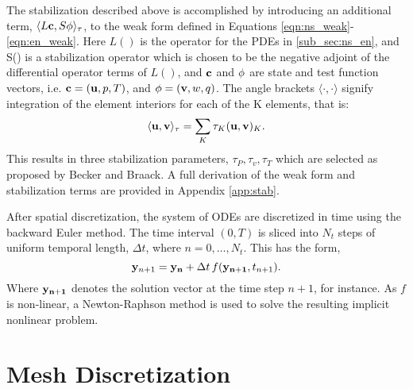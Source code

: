 The stabilization described above is accomplished by introducing an additional term,
$\langle L{\bf c},S {\bf \phi} \rangle_\tau$, to the weak form defined in Equations
\ref{eqn:ns_weak}-\ref{eqn:en_weak}. Here $L()$ is the operator for the PDEs
in \ref{sub_sec:ns_en}, and S() is a stabilization operator
which is chosen to be the negative adjoint of the differential operator
terms of $L()$, and ${\bf c}$ and ${\bf \phi}$ are state and test
function vectors, i.e. $ {\bf c}= ({\bf u},p,T)$, and ${\bf \phi} = (
{\bf v},w,q )$. The angle brackets $\langle \cdot,\cdot \rangle$ signify
integration of the element interiors for each of the K elements, that is:
\begin{equation}
 \langle {\bf u},{\bf v} \rangle_\tau = \sum_K \tau_K({\bf u},{\bf v})_K.
\end{equation}
This results in three stabilization parameters, $\tau_P, \tau_v, \tau_T$ 
which are selected as proposed by Becker and Braack. 
A full derivation of the weak form and stabilization terms are provided
in Appendix \ref{app:stab}. 

After spatial discretization, the system of ODEs are discretized in time
using the backward Euler method\cite{moin2010fundamentals}. The time
interval $(0,T)$ is sliced into $N_t$ steps of uniform temporal length,
$\Delta t$, where $n = 0,\dots,N_t$.  
This has the form, 
\begin{equation}
 {\bf y}_{n+1} = {\bf y_n } + \Delta t \, f({\bf y_{n+1}},t_{n+1}).
\end{equation}
Where ${\bf y_{n+1}}$ denotes the solution vector at the time step $n+1$, for
instance. As $f$ is non-linear, a Newton-Raphson method is used to solve
the resulting implicit nonlinear problem. 


%
%


\section{Mesh Discretization}


